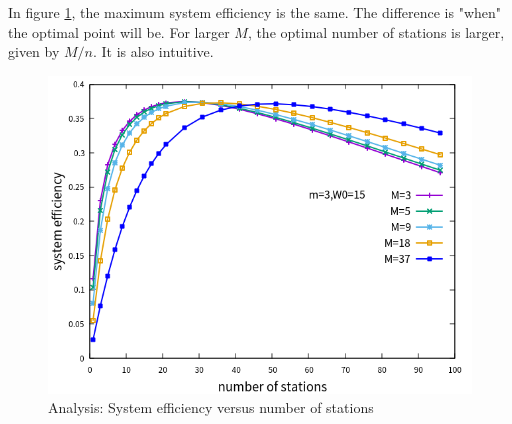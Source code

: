 In figure \ref{fig_n_M_eff}, the maximum system efficiency is the same. 
The difference is "when" the optimal point will be. 
For larger $M$, the optimal number of stations is larger, given by $M/n$. It is also intuitive.

\begin{figure}[!h]
\centering
\includegraphics[scale=.85]{./figure/chp4/n_M_eff_perf.png}
\caption{Analysis: System efficiency versus number of stations}
\label{fig_n_M_eff}
\end{figure}

